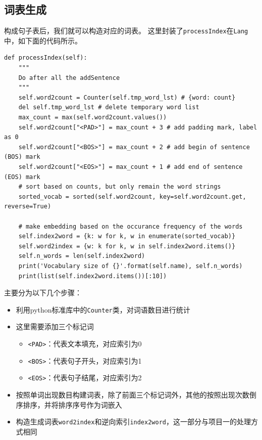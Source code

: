 \documentclass[logo,reportComp]{thesis}
\begin{document}
\subsection{词表生成}
构成句子表后，我们就可以构造对应的词表。
这里封装了\verb'processIndex'在\verb'Lang'中，如下面的代码所示。
\begin{lstlisting}
def processIndex(self):
    """
    Do after all the addSentence
    """
    self.word2count = Counter(self.tmp_word_lst) # {word: count}
    del self.tmp_word_lst # delete temporary word list
    max_count = max(self.word2count.values())
    self.word2count["<PAD>"] = max_count + 3 # add padding mark, label as 0
    self.word2count["<BOS>"] = max_count + 2 # add begin of sentence (BOS) mark
    self.word2count["<EOS>"] = max_count + 1 # add end of sentence (EOS) mark
    # sort based on counts, but only remain the word strings
    sorted_vocab = sorted(self.word2count, key=self.word2count.get, reverse=True)

    # make embedding based on the occurance frequency of the words
    self.index2word = {k: w for k, w in enumerate(sorted_vocab)}
    self.word2index = {w: k for k, w in self.index2word.items()}
    self.n_words = len(self.index2word)
    print('Vocabulary size of {}'.format(self.name), self.n_words)
    print(list(self.index2word.items())[:10])
\end{lstlisting}

主要分为以下几个步骤：
\begin{itemize}
    \item 利用python标准库中的\verb'Counter'类，对词语数目进行统计
    \item 这里需要添加三个标记词
    \begin{itemize}
        \item \verb'<PAD>'：代表文本填充，对应索引为0
        \item \verb'<BOS>'：代表句子开头，对应索引为1
        \item \verb'<EOS>'：代表句子结尾，对应索引为2
    \end{itemize}
    \item 按照单词出现数目构建词表，除了前面三个标记词外，其他的按照出现次数倒序排序，并将排序序号作为词嵌入
    \item 构造生成词表\verb'word2index'和逆向索引\verb'index2word'，这一部分与项目一的处理方式相同
\end{itemize}
\end{document}
